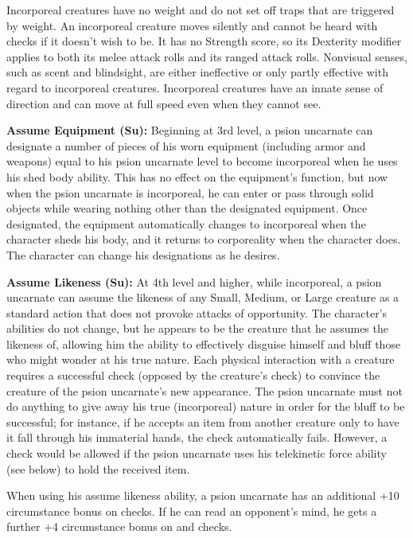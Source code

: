 {Incorporeal creatures have no weight and do not set off traps that are triggered by weight. An incorporeal creature moves silently and cannot be heard with  checks if it doesn't wish to be. It has no Strength score, so its Dexterity modifier applies to both its melee attack rolls and its ranged attack rolls. Nonvisual senses, such as scent and blindsight, are either ineffective or only partly effective with regard to incorporeal creatures. Incorporeal creatures have an innate sense of direction and can move at full speed even when they cannot see.

\textbf{Assume Equipment (Su):} Beginning at 3rd level, a psion uncarnate can designate a number of pieces of his worn equipment (including armor and weapons) equal to his psion uncarnate level to become incorporeal when he uses his shed body ability. This has no effect on the equipment's function, but now when the psion uncarnate is incorporeal, he can enter or pass through solid objects while wearing nothing other than the designated equipment. Once designated, the equipment automatically changes to incorporeal when the character sheds his body, and it returns to corporeality when the character does. The character can change his designations as he desires.

\textbf{Assume Likeness (Su):} At 4th level and higher, while incorporeal, a psion uncarnate can assume the likeness of any Small, Medium, or Large creature as a standard action that does not provoke attacks of opportunity. The character's abilities do not change, but he appears to be the creature that he assumes the likeness of, allowing him the ability to effectively disguise himself and bluff those who might wonder at his true nature. Each physical interaction with a creature requires a successful  check (opposed by the creature's  check) to convince the creature of the psion uncarnate's new appearance. The psion uncarnate must not do anything to give away his true (incorporeal) nature in order for the bluff to be successful; for instance, if he accepts an item from another creature only to have it fall through his immaterial hands, the  check automatically fails. However, a  check would be allowed if the psion uncarnate uses his telekinetic force ability (see below) to hold the received item.

When using his assume likeness ability, a psion uncarnate has an additional +10 circumstance bonus on  checks. If he can read an opponent's mind, he gets a further +4 circumstance bonus on  and  checks.

}
